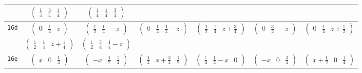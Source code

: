 \documentclass[fleqn,9pt,landscape]{jsarticle}
\begin{document}
\begin{center}
\begin{longtable}{ccccccc}
& $ \begin{pmatrix} \frac{1}{4} & \frac{3}{4} & \frac{1}{4} \end{pmatrix} $ & $ \begin{pmatrix} \frac{1}{4} & \frac{1}{4} & \frac{3}{4} \end{pmatrix} $ & $  $ & $  $ & $  $ & $  $ \\ \hline
{\tt 16d} & $ \begin{pmatrix} 0 & \frac{1}{4} & z \end{pmatrix} $ & $ \begin{pmatrix} \frac{1}{2} & \frac{1}{4} & - z \end{pmatrix} $ & $ \begin{pmatrix} 0 & \frac{1}{4} & \frac{1}{4} - z \end{pmatrix} $ & $ \begin{pmatrix} \frac{1}{2} & \frac{1}{4} & z + \frac{3}{4} \end{pmatrix} $ & $ \begin{pmatrix} 0 & \frac{3}{4} & - z \end{pmatrix} $ & $ \begin{pmatrix} 0 & \frac{1}{4} & z + \frac{1}{2} \end{pmatrix} $ \\
& $ \begin{pmatrix} \frac{1}{2} & \frac{1}{4} & z + \frac{1}{4} \end{pmatrix} $ & $ \begin{pmatrix} \frac{1}{2} & \frac{3}{4} & \frac{1}{4} - z \end{pmatrix} $ & $  $ & $  $ & $  $ & $  $ \\ \hline
{\tt 16e} & $ \begin{pmatrix} x & 0 & \frac{1}{4} \end{pmatrix} $ & $ \begin{pmatrix} - x & \frac{1}{2} & \frac{1}{4} \end{pmatrix} $ & $ \begin{pmatrix} \frac{1}{4} & x + \frac{3}{4} & \frac{1}{2} \end{pmatrix} $ & $ \begin{pmatrix} \frac{1}{4} & \frac{1}{4} - x & 0 \end{pmatrix} $ & $ \begin{pmatrix} - x & 0 & \frac{3}{4} \end{pmatrix} $ & $ \begin{pmatrix} x + \frac{1}{2} & 0 & \frac{1}{4} \end{pmatrix} $ \\

\end{longtable}
\end{center}
\end{document}
